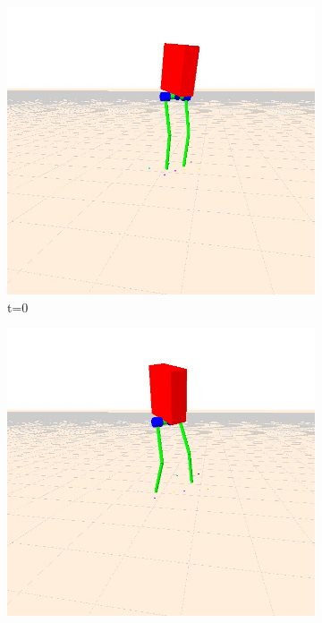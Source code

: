 \documentclass[letterpaper, 10 pt, conference]{ieeeconf}  %
\begin{document}
\begin{figure}[tbp]
  \centering
  \begin{subfigure}[b]{0.3\textwidth}
    \centering
        \includegraphics[width=\textwidth] {figures/balanceYaw1.jpg}
        \caption{t=0}
    \label{fig:balanceYaw1}
    \end{subfigure}\hfill
    \begin{subfigure}[b]{0.3\textwidth}
    \centering
        \includegraphics[width=\textwidth] {figures/balanceYaw2.jpg}

\end{subfigure}
\end{figure}
\end{document}
